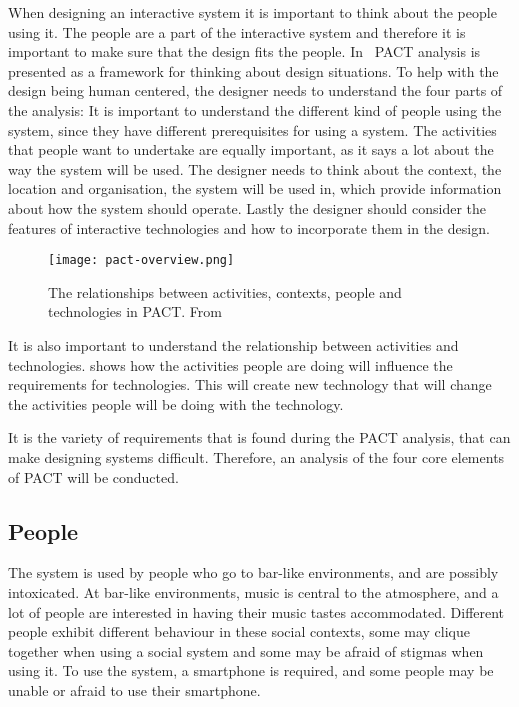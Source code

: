 When designing an interactive system it is important to think about the people using it. The people are a part of the interactive system and therefore it is important to make sure that the design fits the people. In~\cite{benyon2013designing} PACT analysis is presented as a framework for thinking about design situations. To help with the design being human centered, the designer needs to understand the four parts of the analysis: It is important to understand the different kind of people using the system, since they have different prerequisites for using a system. The activities that people want to undertake are equally important, as it says a lot about the way the system will be used. The designer needs to think about the context, the location and organisation, the system will be used in, which provide information about how the system should operate. Lastly the designer should consider the features of interactive technologies and how to incorporate them in the design.

\begin{figure}
  \centering
  \texttt{[image: pact-overview.png]}
  \caption{The relationships between activities, contexts, people and technologies in PACT. From~\cite{benyon2013designing}}
  \label{fig:pact-overview}
\end{figure}

It is also important to understand the relationship between activities and technologies.  shows how the activities people are doing will influence the requirements for technologies. This will create new technology that will change the activities people will be doing with the technology.

It is the variety of requirements that is found during the PACT analysis, that can make designing systems difficult. Therefore, an analysis of the four core elements of PACT will be conducted.


\subsection{People}
\label{sub:pact_people}

The system is used by people who go to bar-like environments, and are possibly intoxicated. At bar-like environments, music is central to the atmosphere, and a lot of people are interested in having their music tastes accommodated. Different people exhibit different behaviour in these social contexts, some may clique together when using a social system and some may be afraid of stigmas when using it. To use the system, a smartphone is required, and some people may be unable or afraid to use their smartphone.

